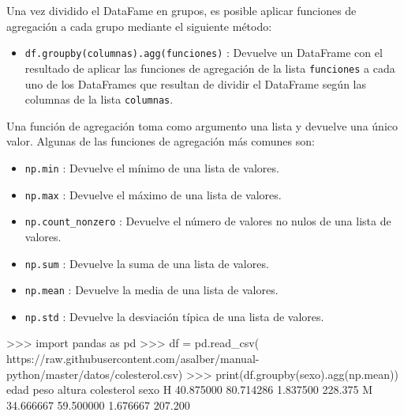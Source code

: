\documentclass[
  spanish,
  a4paper,
]{scrreport}
\newenvironment{Shaded}{\begin{snugshade}}{\end{snugshade}}
\newcommand{\BuiltInTok}[1]{\textcolor[rgb]{0.00,0.23,0.31}{#1}}
\newcommand{\FloatTok}[1]{\textcolor[rgb]{0.68,0.00,0.00}{#1}}
\newcommand{\ImportTok}[1]{\textcolor[rgb]{0.00,0.46,0.62}{#1}}
\newcommand{\NormalTok}[1]{\textcolor[rgb]{0.00,0.23,0.31}{#1}}
\newcommand{\OperatorTok}[1]{\textcolor[rgb]{0.37,0.37,0.37}{#1}}
\newcommand{\StringTok}[1]{\textcolor[rgb]{0.13,0.47,0.30}{#1}}
\providecommand{\tightlist}{%
  \setlength{\itemsep}{0pt}\setlength{\parskip}{0pt}}
\begin{document}
Una vez dividido el DataFame en grupos, es posible aplicar funciones de
agregación a cada grupo mediante el siguiente método:

\begin{itemize}
\tightlist
\item
  \texttt{df.groupby(columnas).agg(funciones)} : Devuelve un DataFrame
  con el resultado de aplicar las funciones de agregación de la lista
  \texttt{funciones} a cada uno de los DataFrames que resultan de
  dividir el DataFrame según las columnas de la lista \texttt{columnas}.
\end{itemize}

Una función de agregación toma como argumento una lista y devuelve una
único valor. Algunas de las funciones de agregación más comunes son:

\begin{itemize}
\tightlist
\item
  \texttt{np.min} : Devuelve el mínimo de una lista de valores.
\item
  \texttt{np.max} : Devuelve el máximo de una lista de valores.
\item
  \texttt{np.count\_nonzero} : Devuelve el número de valores no nulos de
  una lista de valores.
\item
  \texttt{np.sum} : Devuelve la suma de una lista de valores.
\item
  \texttt{np.mean} : Devuelve la media de una lista de valores.
\item
  \texttt{np.std} : Devuelve la desviación típica de una lista de
  valores.
\end{itemize}

\begin{Shaded}
\begin{Highlighting}[]
\OperatorTok{\textgreater{}\textgreater{}\textgreater{}} \ImportTok{import}\NormalTok{ pandas }\ImportTok{as}\NormalTok{ pd}
\OperatorTok{\textgreater{}\textgreater{}\textgreater{}}\NormalTok{ df }\OperatorTok{=}\NormalTok{ pd.read\_csv(}
\StringTok{\textquotesingle{}https://raw.githubusercontent.com/asalber/manual{-}python/master/datos/colesterol.csv\textquotesingle{}}\NormalTok{)}
\OperatorTok{\textgreater{}\textgreater{}\textgreater{}} \BuiltInTok{print}\NormalTok{(df.groupby(}\StringTok{\textquotesingle{}sexo\textquotesingle{}}\NormalTok{).agg(np.mean))}
\NormalTok{           edad       peso    altura  colesterol}
\NormalTok{sexo                                            }
\NormalTok{H     }\FloatTok{40.875000}  \FloatTok{80.714286}  \FloatTok{1.837500}     \FloatTok{228.375}
\NormalTok{M     }\FloatTok{34.666667}  \FloatTok{59.500000}  \FloatTok{1.676667}     \FloatTok{207.200}
\end{Highlighting}
\end{Shaded}
\end{document}
